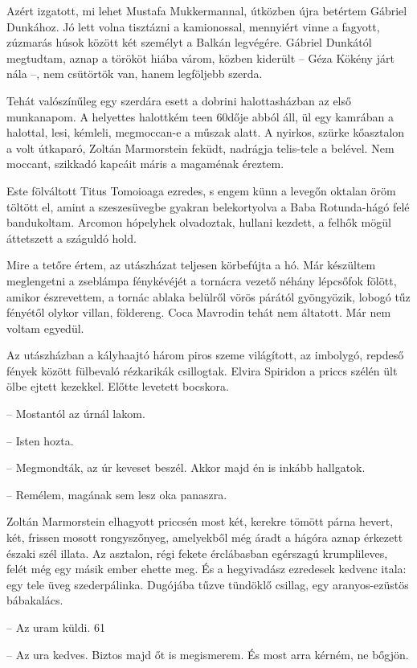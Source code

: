 \documentclass{IEEEtran}
\begin{document}
Azért izgatott, mi lehet Mustafa Mukkermannal, útközben újra betértem Gábriel
Dunkához. Jó lett volna tisztázni a kamionossal, mennyiért vinne a fagyott,
zúzmarás húsok között két személyt a Balkán legvégére. Gábriel Dunkától
megtudtam, aznap a törököt hiába várom, közben kiderült – Géza Kökény járt
nála –, nem csütörtök van, hanem legföljebb szerda.

Tehát valószínűleg egy szerdára esett a dobrini halottasházban az első
munkanapom. A helyettes halottkém teen 60dője abból áll, ül egy kamrában a
halottal, lesi, kémleli, megmoccan-e a műszak alatt. A nyirkos, szürke
kőasztalon a volt útkaparó, Zoltán Marmorstein feküdt, nadrágja telis-tele a
belével. Nem moccant, szikkadó kapcáit máris a magaménak éreztem.

Este fölváltott Titus Tomoioaga ezredes, s engem künn a levegőn oktalan öröm
töltött el, amint a szeszesüvegbe gyakran belekortyolva a Baba Rotunda-hágó
felé bandukoltam. Arcomon hópelyhek olvadoztak, hullani kezdett, a felhők
mögül áttetszett a száguldó hold.

Mire a tetőre értem, az utászházat teljesen körbefújta a hó. Már készültem
meglengetni a zseblámpa fénykévéjét a tornácra vezető néhány lépcsőfok fölött,
amikor észrevettem, a tornác ablaka belülről vörös párától gyöngyözik, lobogó
tűz fényétől olykor villan, földereng. Coca Mavrodin tehát nem áltatott. Már
nem voltam egyedül.

Az utászházban a kályhaajtó három piros szeme világított, az imbolygó, repdeső
fények között fülbevaló rézkarikák csillogtak. Elvira Spiridon a priccs szélén
ült ölbe ejtett kezekkel. Előtte levetett bocskora.

– Mostantól az úrnál lakom.

– Isten hozta.

– Megmondták, az úr keveset beszél. Akkor majd én is inkább hallgatok.

– Remélem, magának sem lesz oka panaszra.

Zoltán Marmorstein elhagyott priccsén most két, kerekre tömött párna hevert,
két, frissen mosott rongyszőnyeg, amelyekből még áradt a hágóra aznap érkezett
északi szél illata. Az asztalon, régi fekete érclábasban egérszagú
krumplileves, felét még egy másik ember ehette meg. És a hegyivadász ezredesek
kedvenc itala: egy tele üveg szederpálinka. Dugójába tűzve tündöklő csillag,
egy aranyos-ezüstös bábakalács.

– Az uram küldi.
61

– Az ura kedves. Biztos majd őt is megismerem. És most arra kérném, ne bőgjön.
\end{document}
